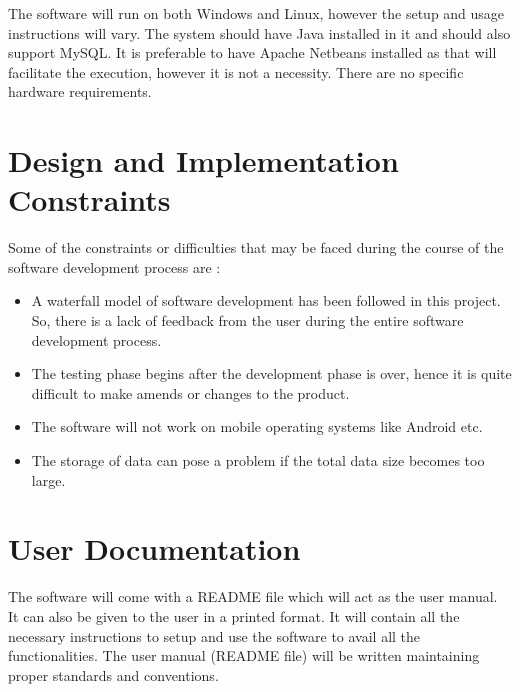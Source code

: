 \documentclass{scrreprt}
\begin{document}
The software will run on both Windows and Linux, however the setup and usage instructions will vary. The system should have Java installed in it and should also support MySQL. It is preferable to have Apache Netbeans installed as that will facilitate the execution, however it is not a necessity. There are no specific hardware requirements.

\section{Design and Implementation Constraints}

Some of the constraints or difficulties that may be faced during the course of the software development process are :
\begin{itemize}
    \item A waterfall model of software development has been followed in this project. So, there is a lack of feedback from the user during the entire software development process.
    \item The testing phase begins after the development phase is over, hence it is quite difficult to make amends or changes to the product.
    \item The software will not work on mobile operating systems like Android etc.
    \item The storage of data can pose a problem if the total data size becomes too large.
\end{itemize}

\section{User Documentation}

The software will come with a README file which will act as the user manual. It can also be given to the user in a printed format. It will contain all the necessary instructions to setup and use the software to avail all the functionalities. The user manual (README file) will be written maintaining proper standards and conventions.
\end{document}
